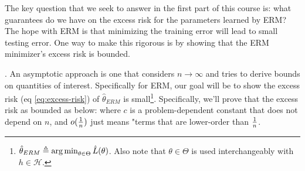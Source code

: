 \documentclass[11pt]{article}
\begin{document}
\begin{myquote}
	The key question that we seek to answer in the first part of this course is: what guarantees do we have on the excess risk for the parameters learned by ERM? The hope with ERM is that minimizing the training error will lead to small testing error. One way to make this rigorous is by showing that the  ERM minimizer's excess risk is bounded.
\end{myquote}

 . An asymptotic approach is one that considers $n \rightarrow \infty$ and tries to derive bounds on quantities of interest. Specifically for ERM, our goal will be to show the excess risk (eq \ref{eq:excess-risk}) of $\hat{\theta}_{ERM}$ is small\footnote{$\hat \theta_{ERM} \triangleq \operatorname*{arg\,min}_{\theta \in \Theta} \hat L(\theta)$. Also note that $\theta \in \Theta$ is used interchangeably with $h \in \mathcal H$.}.  Specifically, we'll prove that the excess risk as bounded as below:
where $c$ is a problem-dependent constant that does not depend on $n$, and $o(\frac{1}{n})$ just means "terms that are lower-order than $\frac{1}{n}$. 
\end{document}
